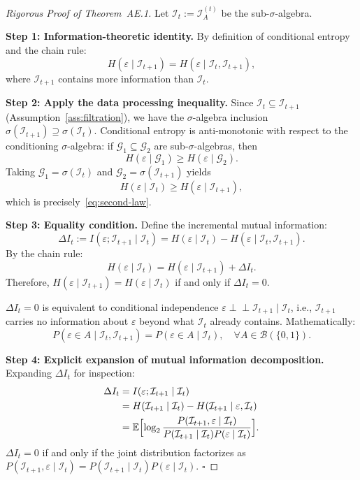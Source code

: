 \documentclass[12pt,a4paper]{article}
\newcommand{\cI}{\mathcal{I}}
\begin{document}
\begin{proof}[Rigorous Proof of Theorem~AE.1]
Let $\cI_t := \cI_A^{(t)}$ be the sub-$\sigma$-algebra.

\textbf{Step 1: Information-theoretic identity.}
By definition of conditional entropy and the chain rule:
\[
H(\varepsilon \mid \cI_{t+1}) = H(\varepsilon \mid \cI_t, \cI_{t+1}),
\]
where $\cI_{t+1}$ contains more information than $\cI_t$.

\textbf{Step 2: Apply the data processing inequality.}
Since $\cI_t \subseteq \cI_{t+1}$ (Assumption~\ref{ass:filtration}), we have the $\sigma$-algebra inclusion $\sigma(\cI_{t+1}) \supseteq \sigma(\cI_t)$. Conditional entropy is anti-monotonic with respect to the conditioning $\sigma$-algebra: if $\mathcal{G}_1 \subseteq \mathcal{G}_2$ are sub-$\sigma$-algebras, then
\[
H(\varepsilon \mid \mathcal{G}_1) \ge H(\varepsilon \mid \mathcal{G}_2).
\]
Taking $\mathcal{G}_1 = \sigma(\cI_t)$ and $\mathcal{G}_2 = \sigma(\cI_{t+1})$ yields
\[
H(\varepsilon \mid \cI_t) \ge H(\varepsilon \mid \cI_{t+1}),
\]
which is precisely~\eqref{eq:second-law}.

\textbf{Step 3: Equality condition.}
Define the incremental mutual information:
\[
\Delta I_t := I(\varepsilon; \cI_{t+1} \mid \cI_t) = H(\varepsilon \mid \cI_t) - H(\varepsilon \mid \cI_t, \cI_{t+1}).
\]
By the chain rule:
\[
H(\varepsilon \mid \cI_t) = H(\varepsilon \mid \cI_{t+1}) + \Delta I_t.
\]
Therefore, $H(\varepsilon \mid \cI_{t+1}) = H(\varepsilon \mid \cI_t)$ if and only if $\Delta I_t = 0$.

$\Delta I_t = 0$ is equivalent to conditional independence $\varepsilon \perp\!\!\!\perp \cI_{t+1} \mid \cI_t$, i.e., $\cI_{t+1}$ carries no information about $\varepsilon$ beyond what $\cI_t$ already contains. Mathematically:
\[
P(\varepsilon \in A \mid \cI_t, \cI_{t+1}) = P(\varepsilon \in A \mid \cI_t),\quad \forall A \in \mathcal{B}(\{0,1\}).
\]

\textbf{Step 4: Explicit expansion of mutual information decomposition.}
Expanding $\Delta I_t$ for inspection:
\[
\begin{aligned}
\Delta I_t &= I(\varepsilon; \cI_{t+1} \mid \cI_t) \\
&= H(\cI_{t+1} \mid \cI_t) - H(\cI_{t+1} \mid \varepsilon, \cI_t) \\
&= \mathbb{E}\Bigl[ \log_2 \frac{P(\cI_{t+1}, \varepsilon \mid \cI_t)}{P(\cI_{t+1} \mid \cI_t) P(\varepsilon \mid \cI_t)} \Bigr].
\end{aligned}
\]
$\Delta I_t = 0$ if and only if the joint distribution factorizes as $P(\cI_{t+1}, \varepsilon \mid \cI_t) = P(\cI_{t+1} \mid \cI_t) P(\varepsilon \mid \cI_t)$. $\square$
\end{proof}
\end{document}

